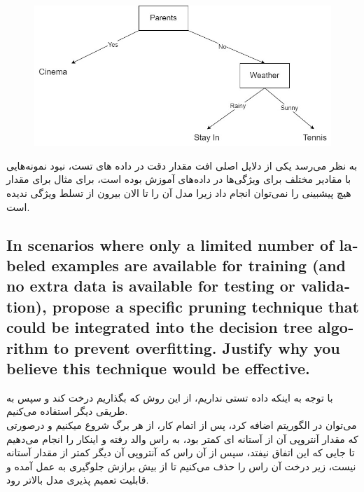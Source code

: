 \documentclass{article}
\begin{document}
	\begin{figure}[h!]
		\centering
		\includegraphics[scale=0.5]{figs/ID3_Q2_c}
	\end{figure}
	به نظر می‌رسد یکی از دلایل اصلی افت مقدار دقت در داده های تست، نبود نمونه‌هایی با مقادیر مختلف برای ویژگی‌ها در داده‌های آموزش بوده است، برای مثال برای مقدار 
	هیچ پیشبینی را نمی‌توان انجام داد زیرا مدل آن را تا الان بیرون از تسلط ویژگی 
	ندیده است.
	\begin{latin}
		\subsection{In scenarios where only a limited number of labeled examples are
			available for training (and no extra data is available for testing or
			validation), propose a specific pruning technique that could be integrated
			into the decision tree algorithm to prevent overfitting. Justify why you
			believe this technique would be effective.}
	\end{latin}
	با توجه به اینکه داده تستی نداریم، از این روش که بگذاریم درخت 
	کند و سپس 
	به طریقی دیگر استفاده می‌کنیم.\\
	می‌توان در الگوریتم اضافه کرد، پس از اتمام کار، از هر برگ شروع میکنیم و درصورتی که مقدار آنتروپی آن از آستانه ای کمتر بود، به راس والد رفته و اینکار را انجام می‌دهیم تا جایی که این اتفاق نیفتد، سپس از آن راس که آنتروپی آن  دیگر کمتر از مقدار آستانه نیست، زیر درخت آن راس را حذف می‌کنیم تا از بیش برازش جلوگیری به عمل آمده و قابلیت تعمیم پذیری مدل بالاتر رود.
\end{document}
